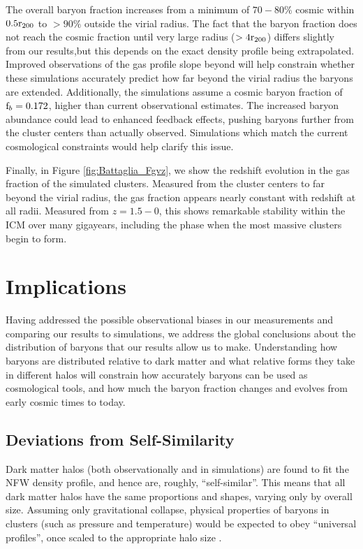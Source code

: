 The overall baryon fraction increases from a minimum of $70-80\%$
cosmic within $0.5\textrm{r\ensuremath{_{200}}}{}$ to $>90\%$ outside the virial radius. The
fact that the baryon fraction does not reach the cosmic fraction until
very large radius ($>4\textrm{r\ensuremath{_{200}}}{}$) differs slightly from our results,but
this depends on the exact density profile being extrapolated.
Improved observations of the gas profile slope beyond \rtwo{} will
help constrain whether these simulations accurately predict how far
beyond the virial radius the baryons are extended. Additionally, the
simulations assume a cosmic baryon fraction of $\textrm{f\ensuremath{_b}}{} = 0.172$, higher
than current observational estimates. The increased baryon abundance
could lead to enhanced feedback effects, pushing baryons further from
the cluster centers than actually observed. Simulations which match
the current cosmological constraints would help clarify this issue.



Finally, in Figure \ref{fig:Battaglia_Fgvz}, we show the redshift
evolution in the gas fraction of the \citet{Battaglia2013} simulated
clusters. Measured from the cluster centers to far beyond the virial
radius, the gas fraction appears nearly constant with redshift at all
radii. Measured from $z=1.5-0$, this shows remarkable stability within
the ICM over many gigayears, including the phase when the most massive
clusters begin to form.

\section{Implications}
\label{sec:Implications}

Having addressed the possible observational biases in our measurements
and comparing our results to simulations, we address the global
conclusions about the distribution of baryons that our results allow
us to make. Understanding how baryons are distributed relative to dark
matter and what relative forms they take in different halos will
constrain how accurately baryons can be used as cosmological tools,
and how much the baryon fraction changes and evolves from early
cosmic times to today.

\subsection{Deviations from Self-Similarity}
\label{sec:Implications.Invariance}

Dark matter halos (both observationally and in simulations) are found
to fit the NFW density profile, and hence are, roughly,
``self-similar''. This means that all dark matter halos have the same
proportions and shapes, varying only by overall size. Assuming only
gravitational collapse, physical properties of baryons in clusters
(such as pressure and temperature) would be expected to obey
``universal profiles'', once scaled to the appropriate halo size
.

